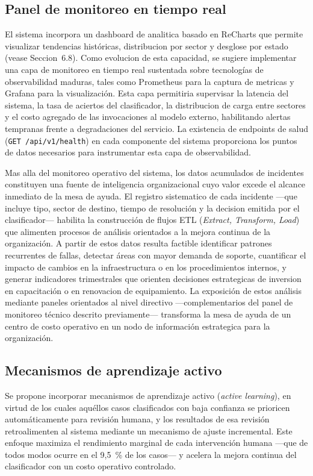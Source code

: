 \subsection{Panel de monitoreo en tiempo real}

El sistema incorpora un dashboard de analitica basado en ReCharts que permite visualizar tendencias históricas, distribucion por sector y desglose por estado (vease Seccion~6.8). Como evolucion de esta capacidad, se sugiere implementar una capa de monitoreo en tiempo real sustentada sobre tecnologías de observabilidad maduras, tales como Prometheus para la captura de metricas y Grafana para la visualización. Esta capa permitiria supervisar la latencia del sistema, la tasa de aciertos del clasificador, la distribucion de carga entre sectores y el costo agregado de las invocaciones al modelo externo, habilitando alertas tempranas frente a degradaciones del servicio. La existencia de endpoints de salud (\texttt{GET /api/v1/health}) en cada componente del sistema proporciona los puntos de datos necesarios para instrumentar esta capa de observabilidad.

Mas alla del monitoreo operativo del sistema, los datos acumulados de incidentes constituyen una fuente de inteligencia organizacional cuyo valor excede el alcance inmediato de la mesa de ayuda. El registro sistematico de cada incidente ---que incluye tipo, sector de destino, tiempo de resolución y la decision emitida por el clasificador--- habilita la construcción de flujos ETL (\emph{Extract, Transform, Load}) que alimenten procesos de análisis orientados a la mejora continua de la organización. A partir de estos datos resulta factible identificar patrones recurrentes de fallas, detectar áreas con mayor demanda de soporte, cuantificar el impacto de cambios en la infraestructura o en los procedimientos internos, y generar indicadores trimestrales que orienten decisiones estrategicas de inversion en capacitación o en renovacion de equipamiento. La exposición de estos análisis mediante paneles orientados al nivel directivo ---complementarios del panel de monitoreo técnico descrito previamente--- transforma la mesa de ayuda de un centro de costo operativo en un nodo de información estrategica para la organización.

\subsection{Mecanismos de aprendizaje activo}

Se propone incorporar mecanismos de aprendizaje activo (\emph{active learning}), en virtud de los cuales aquéllos casos clasificados con baja confianza se prioricen automáticamente para revisión humana, y los resultados de esa revisión retroalimenten al sistema mediante un mecanismo de ajuste incremental. Este enfoque maximiza el rendimiento marginal de cada intervención humana ---que de todos modos ocurre en el 9,5~\% de los casos--- y acelera la mejora continua del clasificador con un costo operativo controlado.

